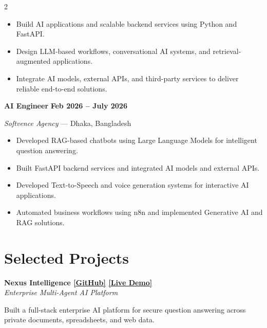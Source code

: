\documentclass[10pt,a4paper]{article}
\newcommand{\job}[4]{
    \textbf{\large #1}
    \hfill
    \textbf{\small #4}

    \textit{#2} --- #3

    \vspace{1mm}
}
\newcommand{\project}[2]{
    \textbf{#1}\\
    \textit{\small #2}
}
\begin{document}
\begin{multicols}{2}
\begin{itemize}
\item Build AI applications and scalable backend services using Python and FastAPI.

\item Design LLM-based workflows, conversational AI systems, and retrieval-augmented applications.

\item Integrate AI models, external APIs, and third-party services to deliver reliable end-to-end solutions.

\end{itemize}

\vspace{2mm}

\job
{AI Engineer}
{Softvence Agency}
{Dhaka, Bangladesh}
{Feb 2026 -- July 2026}

\begin{itemize}

\item Developed RAG-based chatbots using Large Language Models for intelligent question answering.

\item Built FastAPI backend services and integrated AI models and external APIs.

\item Developed Text-to-Speech and voice generation systems for interactive AI applications.

\item Automated business workflows using n8n and implemented Generative AI and RAG solutions.

\end{itemize}

\vspace{2mm}

\section{Selected Projects}

\project
{Nexus Intelligence \href{https://github.com/Shah-Abdul-Mazid/Nexus-Enterprise-Intelligence-Platform}{[GitHub]}
\href{https://nexus-enterprise-intelligence-platform.vercel.app/auth}{[Live Demo]}}
{Enterprise Multi-Agent AI Platform}
\vspace{0.5mm}

Built a full-stack enterprise AI platform for secure question answering across private documents, spreadsheets, and web data.


\end{multicols}
\end{document}
